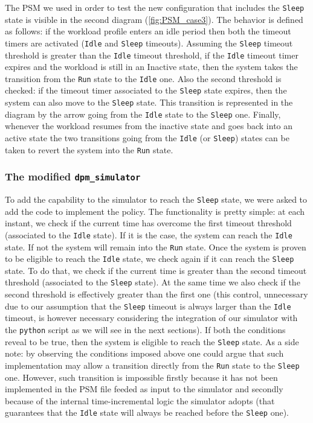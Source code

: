 \documentclass[a4paper]{article}
\begin{document}
            The PSM we used in order to test the new configuration that includes the \texttt{Sleep} state is visible in the second diagram (\ref{fig:PSM_case3}).
            The behavior is defined as follows: if the workload profile enters an idle period then both the timeout timers are activated (\texttt{Idle} and \texttt{Sleep} timeouts). Assuming the \texttt{Sleep} timeout threshold is greater than the \texttt{Idle} timeout threshold, if the \texttt{Idle} timeout timer expires and the workload is still in an Inactive state, then the system takes the transition from the \texttt{Run} state to the \texttt{Idle} one.
            Also the second threshold is checked: if the timeout timer associated to the \texttt{Sleep} state expires, then the system can also move to the \texttt{Sleep} state. This transition is represented in the diagram by the arrow going from the \texttt{Idle} state to the \texttt{Sleep} one.
            Finally, whenever the workload resumes from the inactive state and goes back into an active state the two transitions going from the \texttt{Idle} (or \texttt{Sleep}) states can be taken to revert the system into the \texttt{Run} state.

        \subsubsection{The modified \texttt{dpm\_simulator}}
            To add the capability to the simulator to reach the \texttt{Sleep} state, we were asked to add the code to implement the policy. The functionality is pretty simple: at each instant, we check if the current time has overcome the first timeout threshold (associated to the \texttt{Idle} state). If it is the case, the system can reach the \texttt{Idle} state. If not the system will remain into the \texttt{Run} state. Once the system is proven to be eligible to reach the \texttt{Idle} state, we check again if it can reach the \texttt{Sleep} state. To do that, we check if the current time is greater than the second timeout threshold (associated to the \texttt{Sleep} state). At the same time we also check if the second threshold is effectively greater than the first one (this control, unnecessary due to our assumption that the \texttt{Sleep} timeout is always larger than the \texttt{Idle} timeout, is however necessary considering the integration of our simulator with the \texttt{python} script as we will see in the next sections). If both the conditions reveal to be true, then the system is eligible to reach the \texttt{Sleep} state.
            As a side note: by observing the conditions imposed above one could argue that such implementation may allow a transition directly from the \texttt{Run} state to the \texttt{Sleep} one. However, such transition is impossible firstly because it has not been implemented in the PSM file feeded as input to the simulator and secondly because of the internal time-incremental logic the simulator adopts (that guarantees that the \texttt{Idle} state will always be reached before the \texttt{Sleep} one).
\end{document}
